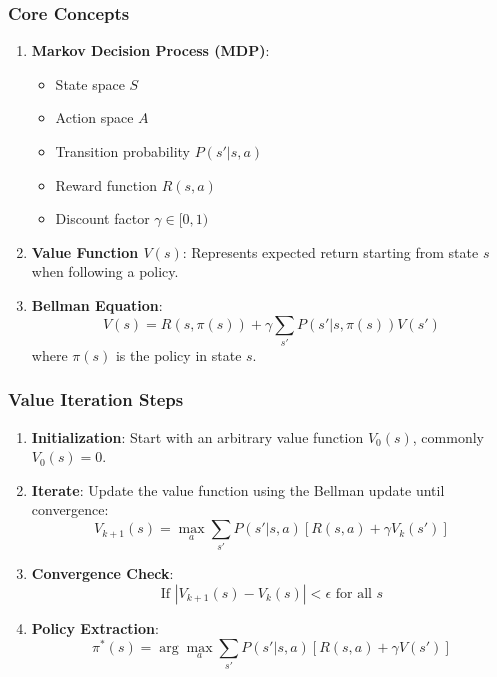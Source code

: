 \documentclass[aspectratio=169]{beamer}
\begin{document}
\begin{frame}
    \frametitle{Core Concepts}
    \begin{enumerate}
        \item \textbf{Markov Decision Process (MDP)}:
            \begin{itemize}
                \item State space \( S \)
                \item Action space \( A \)
                \item Transition probability \( P(s' | s, a) \)
                \item Reward function \( R(s, a) \)
                \item Discount factor \( \gamma \in [0, 1) \)
            \end{itemize}
        
        \item \textbf{Value Function \( V(s) \)}:
            Represents expected return starting from state \( s \) when following a policy.
        
        \item \textbf{Bellman Equation}:
            \begin{equation}
                V(s) = R(s, \pi(s)) + \gamma \sum_{s'} P(s' | s, \pi(s)) V(s')
            \end{equation}
            where \( \pi(s) \) is the policy in state \( s \).
    \end{enumerate}
\end{frame}

\begin{frame}
    \frametitle{Value Iteration Steps}
    \begin{enumerate}
        \item \textbf{Initialization}:
            Start with an arbitrary value function \( V_0(s) \), commonly \( V_0(s) = 0 \).
        
        \item \textbf{Iterate}:
            Update the value function using the Bellman update until convergence:
            \begin{equation}
                V_{k+1}(s) = \max_a \sum_{s'} P(s' | s, a) \left[ R(s, a) + \gamma V_k(s') \right]
            \end{equation}
        
        \item \textbf{Convergence Check}:
            \begin{equation}
                \text{If } | V_{k+1}(s) - V_k(s) | < \epsilon \text{ for all } s
            \end{equation}
        
        \item \textbf{Policy Extraction}:
            \begin{equation}
                \pi^*(s) = \arg \max_a \sum_{s'} P(s' | s, a) \left[ R(s, a) + \gamma V(s') \right]
            \end{equation}
    \end{enumerate}
\end{frame}
\end{document}
